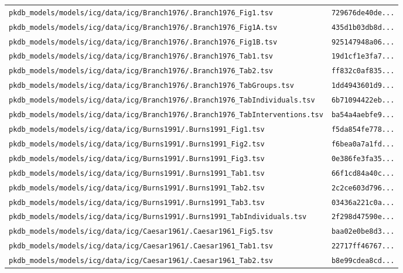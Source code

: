 \begin{longtable}{ll}
\texttt{pkdb\_models/models/icg/data/icg/Branch1976/.Branch1976\_Fig1.tsv} & \texttt{729676de40de...} \\
\texttt{pkdb\_models/models/icg/data/icg/Branch1976/.Branch1976\_Fig1A.tsv} & \texttt{435d1b03db8d...} \\
\texttt{pkdb\_models/models/icg/data/icg/Branch1976/.Branch1976\_Fig1B.tsv} & \texttt{925147948a06...} \\
\texttt{pkdb\_models/models/icg/data/icg/Branch1976/.Branch1976\_Tab1.tsv} & \texttt{19d1cf1e3fa7...} \\
\texttt{pkdb\_models/models/icg/data/icg/Branch1976/.Branch1976\_Tab2.tsv} & \texttt{ff832c0af835...} \\
\texttt{pkdb\_models/models/icg/data/icg/Branch1976/.Branch1976\_TabGroups.tsv} & \texttt{1dd4943601d9...} \\
\texttt{pkdb\_models/models/icg/data/icg/Branch1976/.Branch1976\_TabIndividuals.tsv} & \texttt{6b71094422eb...} \\
\texttt{pkdb\_models/models/icg/data/icg/Branch1976/.Branch1976\_TabInterventions.tsv} & \texttt{ba54a4aebfe9...} \\
\texttt{pkdb\_models/models/icg/data/icg/Burns1991/.Burns1991\_Fig1.tsv} & \texttt{f5da854fe778...} \\
\texttt{pkdb\_models/models/icg/data/icg/Burns1991/.Burns1991\_Fig2.tsv} & \texttt{f6bea0a7a1fd...} \\
\texttt{pkdb\_models/models/icg/data/icg/Burns1991/.Burns1991\_Fig3.tsv} & \texttt{0e386fe3fa35...} \\
\texttt{pkdb\_models/models/icg/data/icg/Burns1991/.Burns1991\_Tab1.tsv} & \texttt{66f1cd84a40c...} \\
\texttt{pkdb\_models/models/icg/data/icg/Burns1991/.Burns1991\_Tab2.tsv} & \texttt{2c2ce603d796...} \\
\texttt{pkdb\_models/models/icg/data/icg/Burns1991/.Burns1991\_Tab3.tsv} & \texttt{03436a221c0a...} \\
\texttt{pkdb\_models/models/icg/data/icg/Burns1991/.Burns1991\_TabIndividuals.tsv} & \texttt{2f298d47590e...} \\
\texttt{pkdb\_models/models/icg/data/icg/Caesar1961/.Caesar1961\_Fig5.tsv} & \texttt{baa02e0be8d3...} \\
\texttt{pkdb\_models/models/icg/data/icg/Caesar1961/.Caesar1961\_Tab1.tsv} & \texttt{22717ff46767...} \\
\texttt{pkdb\_models/models/icg/data/icg/Caesar1961/.Caesar1961\_Tab2.tsv} & \texttt{b8e99cdea8cd...} \\

\end{longtable}
